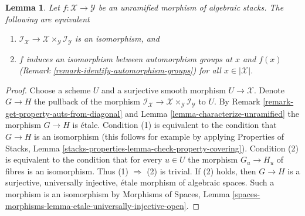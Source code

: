 \documentclass[10pt,a4paper]{amsart}
\theoremstyle{plain}
\newtheorem{lemma}[subsection]{Lemma}
\theoremstyle{definition}
\theoremstyle{remark}
\numberwithin{equation}{subsection}
\begin{document}
\begin{lemma}
\label{lemma-aut-iso-unramified}
Let $f : \mathcal{X} \to \mathcal{Y}$ be an unramified
morphism of algebraic stacks. The following are equivalent
\begin{enumerate}
\item $\mathcal{I}_\mathcal{X} \to
\mathcal{X} \times_\mathcal{Y} \mathcal{I}_\mathcal{Y}$
is an isomorphism, and
\item $f$ induces an isomorphism between automorphism groups at $x$ and $f(x)$
(Remark \ref{remark-identify-automorphism-groups}) for all
$x \in |\mathcal{X}|$.
\end{enumerate}
\end{lemma}

\begin{proof}
Choose a scheme $U$ and a surjective smooth morphism $U \to \mathcal{X}$.
Denote $G \to H$ the pullback of the morphism
$\mathcal{I}_\mathcal{X} \to
\mathcal{X} \times_\mathcal{Y} \mathcal{I}_\mathcal{Y}$
to $U$. By Remark \ref{remark-get-property-auts-from-diagonal} and
Lemma \ref{lemma-characterize-unramified} the morphism $G \to H$ is \'etale.
Condition (1) is equivalent to the condition that
$G \to H$ is an isomorphism (this follows for example by applying
Properties of Stacks, Lemma
\ref{stacks-properties-lemma-check-property-covering}).
Condition (2) is equivalent to the condition that
for every $u \in U$ the morphism $G_u \to H_u$ of fibres
is an isomorphism. Thus (1) $\Rightarrow$ (2) is trivial.
If (2) holds, then $G \to H$ is a surjective, universally injective,
\'etale morphism of algebraic spaces. Such a morphism is an isomorphism by
Morphisms of Spaces, Lemma
\ref{spaces-morphisms-lemma-etale-universally-injective-open}.
\end{proof}
\end{document}
